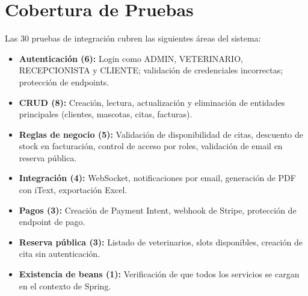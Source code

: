 \section{Cobertura de Pruebas}

Las 30 pruebas de integraci\'on cubren las siguientes \'areas del sistema:

\begin{itemize}
    \item \textbf{Autenticaci\'on (6):} Login como ADMIN, VETERINARIO, RECEPCIONISTA y CLIENTE; validaci\'on de credenciales incorrectas; protecci\'on de endpoints.
    \item \textbf{CRUD (8):} Creaci\'on, lectura, actualizaci\'on y eliminaci\'on de entidades principales (clientes, mascotas, citas, facturas).
    \item \textbf{Reglas de negocio (5):} Validaci\'on de disponibilidad de citas, descuento de stock en facturaci\'on, control de acceso por roles, validaci\'on de email en reserva p\'ublica.
    \item \textbf{Integraci\'on (4):} WebSocket, notificaciones por email, generaci\'on de PDF con iText, exportaci\'on Excel.
    \item \textbf{Pagos (3):} Creaci\'on de Payment Intent, webhook de Stripe, protecci\'on de endpoint de pago.
    \item \textbf{Reserva p\'ublica (3):} Listado de veterinarios, slots disponibles, creaci\'on de cita sin autenticaci\'on.
    \item \textbf{Existencia de beans (1):} Verificaci\'on de que todos los servicios se cargan en el contexto de Spring.
\end{itemize}
